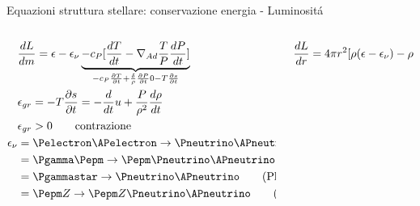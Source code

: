 \begin{frame}{Equazioni struttura stellare: conservazione energia - Luminosit\'a}
\begin{columns}[T]
\begin{column}{0.4\textwidth}
\begin{align*}
&\TDy{m}{L}=\epsilon-\epsilon_{\nu} \underbrace{-c_P[\TDy{t}{T}-\nad\frac{T}{P}\TDy{t}{P}]}_{-c_P\PDy{t}{T}+\frac{\delta}{\rho}\PDy{t}{P}0-T\PDy{t}{s}}\\
&\epsilon_{gr}=-T\PDy{t}{s}=-\TDof{t}u+\frac{P}{\rho^2}\TDy{t}{\rho}\\
&\epsilon_{gr}>0\tag*{contrazione}\\
\epsilon_{\nu}&=\Pelectron\APelectron\to\Pneutrino\APneutrino\tag{Pair annihilation}\\
&=\Pgamma\Pepm\to\Pepm\Pneutrino\APneutrino\tag{Photoproduction}\\
&=\Pgammastar\to\Pneutrino\APneutrino\tag{Plasmon decay}\\
&=\Pepm Z\to\Pepm Z\Pneutrino\APneutrino\tag{Bremsstahlung}\\
    \end{align*}

\end{column}\begin{column}{0.6\textwidth}
\begin{align*}
&\TDy{r}{L}=4\pi r^2[\rho(\epsilon-\epsilon_{\nu})-\rho\TDof{t}u+\frac{P}{\rho}\TDy{t}{\rho}]\\
&
\end{align*}
\end{column}
\end{columns}
\end{frame}

